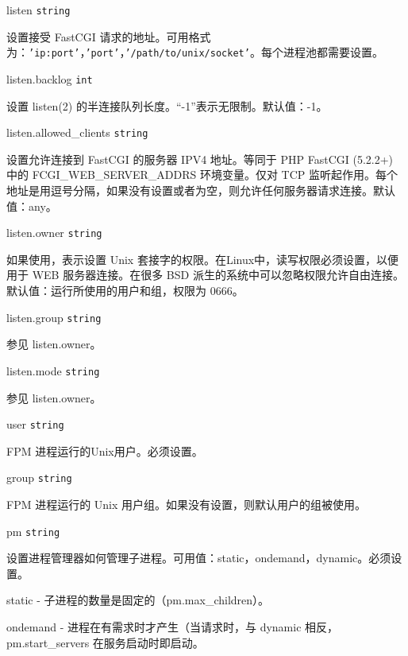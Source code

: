 \begin{compactitem}
\item listen \texttt{string}

设置接受 FastCGI 请求的地址。可用格式为：\texttt{'ip:port'}，\texttt{'port'}，\texttt{'/path/to/unix/socket'}。每个进程池都需要设置。

\item listen.backlog \texttt{int}

设置 listen(2) 的半连接队列长度。“-1”表示无限制。默认值：-1。

\item listen.allowed_clients \texttt{string}

设置允许连接到 FastCGI 的服务器 IPV4 地址。等同于 PHP FastCGI (5.2.2+) 中的 FCGI\_WEB\_SERVER\_ADDRS 环境变量。仅对 TCP 监听起作用。每个地址是用逗号分隔，如果没有设置或者为空，则允许任何服务器请求连接。默认值：any。

\item listen.owner \texttt{string}

如果使用，表示设置 Unix 套接字的权限。在Linux中，读写权限必须设置，以便用于 WEB 服务器连接。在很多 BSD 派生的系统中可以忽略权限允许自由连接。默认值：运行所使用的用户和组，权限为 0666。

\item listen.group \texttt{string}

参见 listen.owner。

\item listen.mode \texttt{string}

参见 listen.owner。

\item user \texttt{string}

FPM 进程运行的Unix用户。必须设置。

\item group \texttt{string}

FPM 进程运行的 Unix 用户组。如果没有设置，则默认用户的组被使用。

\item pm \texttt{string}

设置进程管理器如何管理子进程。可用值：static，ondemand，dynamic。必须设置。

\begin{compactenum}
\item static - 子进程的数量是固定的（pm.max\_children）。

\item ondemand - 进程在有需求时才产生（当请求时，与 dynamic 相反，pm.start\_servers 在服务启动时即启动。


\end{compactenum}
\end{compactitem}
